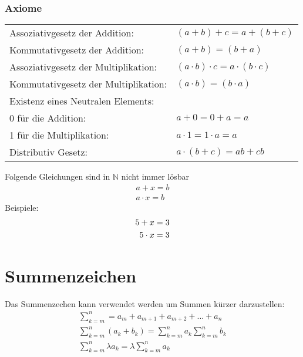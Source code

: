 \documentclass[a4paper]{scrartcl}
\begin{document}
\subsubsection{Axiome}
\begin{tabular}{l l}
Assoziativgesetz der Addition:& $(a+b)+c= a+(b+c)  $ \\
Kommutativgesetz der Addition:& $(a+b)=(b+a) $ \\
Assoziativgesetz der Multiplikation:& $(a \cdot b) \cdot c = a \cdot (b \cdot c) $ \\
Kommutativgesetz der Multiplikation:& $(a \cdot b)=(b \cdot a) $ \\
Existenz eines Neutralen Elements: & \\
\hspace{5pt}  0 für die Addition: & $ a + 0 = 0 + a = a $\\
\hspace{5pt}  1 für die Multiplikation: & $ a \cdot 1 = 1 \cdot a = a $ \\
Distributiv Gesetz: & $ a \cdot (b+c) = ab + cb $ \\
\end{tabular}

\vspace{10pt}

Folgende Gleichungen sind in $\mathbb{N}$ nicht immer lösbar
\begin{align}
a+x=b  \\
 a \cdot x=b
\end{align}
Beispiele:
\begin{align}
5+x=3 \notag \\
5 \cdot x=3 \notag
\end{align}
\newpage

\section{Summenzeichen}
Das Summenzechen kann verwendet werden um Summen kürzer darzustellen: \\
\begin{align}
\sum\limits_{k=m}^n=a_m+a_{m+1}+a_{m+2}+...+a_{n} \\
\sum\limits_{k=m}^n (a_k+b_k) = \sum\limits_{k=m}^n a_k \sum\limits_{k=m}^n b_k \\
\sum\limits_{k=m}^n \lambda a_k = \lambda \sum\limits_{k=m}^n a_k
\end{align}
\end{document}
